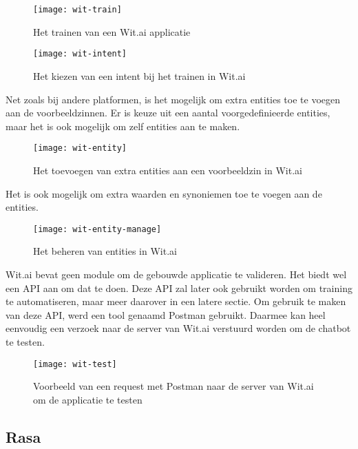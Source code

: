 \begin{figure}[H]
    \label{fig:wit-train}
    \centering
    \texttt{[image: wit-train]}
    \caption{Het trainen van een Wit.ai applicatie}
\end{figure}

\begin{figure}[H]
    \label{fig:wit-intent}
    \centering
    \texttt{[image: wit-intent]}
    \caption{Het kiezen van een intent bij het trainen in Wit.ai}
\end{figure}

Net zoals bij andere platformen, is het mogelijk om extra entities toe te voegen aan de voorbeeldzinnen. Er is keuze uit een aantal voorgedefinieerde entities, maar het is ook mogelijk om zelf entities aan te maken.

\begin{figure}[H]
    \label{fig:wit-entity}
    \centering
    \texttt{[image: wit-entity]}
    \caption{Het toevoegen van extra entities aan een voorbeeldzin in Wit.ai}
\end{figure}

Het is ook mogelijk om extra waarden en synoniemen toe te voegen aan de entities.

\begin{figure}[H]
    \label{fig:wit-intent-manage}
    \centering
    \texttt{[image: wit-entity-manage]}
    \caption{Het beheren van entities in Wit.ai}
\end{figure}

Wit.ai bevat geen module om de gebouwde applicatie te valideren. Het biedt wel een API aan om dat te doen. Deze API zal later ook gebruikt worden om training te automatiseren, maar meer daarover in een latere sectie. Om gebruik te maken van deze API, werd een tool genaamd Postman gebruikt. Daarmee kan heel eenvoudig een verzoek naar de server van Wit.ai verstuurd worden om de chatbot te testen.

\begin{figure}[H]
    \label{fig:wit-test}
    \centering
    \texttt{[image: wit-test]}
    \caption{Voorbeeld van een request met Postman naar de server van Wit.ai om de applicatie te testen}
\end{figure}

\subsection{Rasa}
\label{subsec:werking-platformen-rasa}

